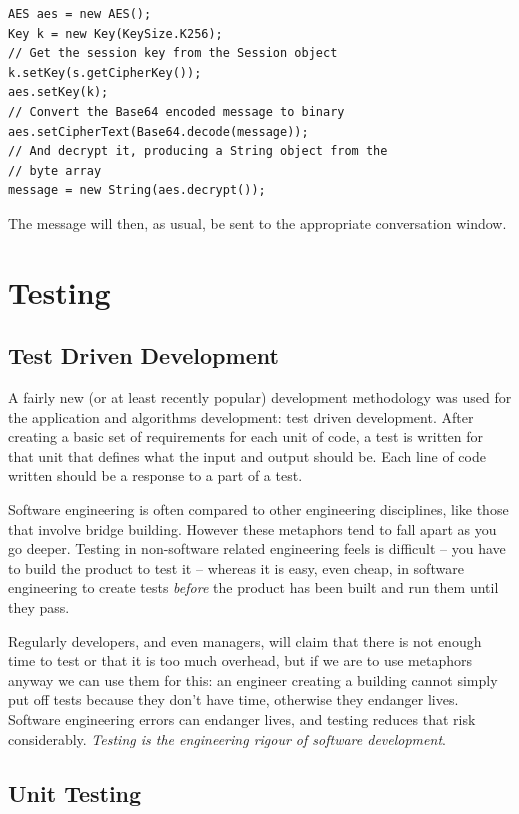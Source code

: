   \begin{lstlisting}
AES aes = new AES();
Key k = new Key(KeySize.K256);
// Get the session key from the Session object
k.setKey(s.getCipherKey());
aes.setKey(k);
// Convert the Base64 encoded message to binary
aes.setCipherText(Base64.decode(message));
// And decrypt it, producing a String object from the 
// byte array
message = new String(aes.decrypt());
\end{lstlisting}

  The message will then, as usual, be sent to the appropriate conversation window.
  
\section{Testing}

\subsection{Test Driven Development}

A fairly new (or at least recently popular) development methodology was used for the application and algorithms development: test driven development. After creating a basic set of requirements for each unit of code, a test is written for that unit that defines what the input and output should be. Each line of code written should be a response to a part of a test.

Software engineering is often compared to other engineering disciplines, like those that involve bridge building. However these metaphors tend to fall apart as you go deeper. Testing in non-software related engineering feels is difficult -- you have to build the product to test it -- whereas it is easy, even cheap, in software engineering to create tests \emph{before} the product has been built and run them until they pass.

Regularly developers, and even managers, will claim that there is not enough time to test or that it is too much overhead, but if we are to use metaphors anyway we can use them for this: an engineer creating a building cannot simply put off tests because they don't have time, otherwise they endanger lives. Software engineering errors can endanger lives\cite{Leveson:1995aa}, and testing reduces that risk considerably. \emph{Testing is the engineering rigour of software development}\cite{Henney:2010aa}.

\subsection{Unit Testing}	

